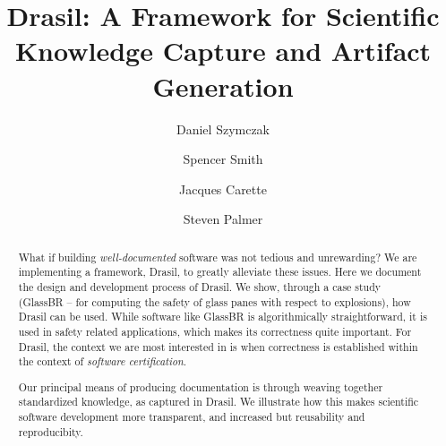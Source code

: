 \documentclass[sigconf]{acmart}
\begin{document}
\title[Drasil Framework]{Drasil: A Framework for Scientific Knowledge Capture and Artifact Generation}

\author{Daniel Szymczak}

\author{Spencer Smith}

\author{Jacques Carette}

\author{Steven Palmer}

\begin{abstract}
What if building \emph{well-documented} software was not tedious and unrewarding?  We
are implementing a framework, Drasil, to greatly alleviate these issues. Here
we document the design and development process of Drasil.  We show, through a case
study (GlassBR -- for computing the safety of glass panes with respect to
explosions), how Drasil can be used. While software like GlassBR is algorithmically
straightforward, it is used in safety related applications, which makes its correctness
quite important. For Drasil, the context we are most interested in is when correctness is
established within the context of \emph{software certification}.

Our principal means of producing documentation is through weaving together
standardized knowledge, as captured in Drasil.  We illustrate how this makes
scientific software development more transparent, and increased but reusability
and reproducibity.
\end{abstract}

%
%
\end{document}
